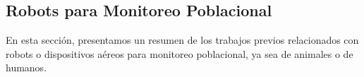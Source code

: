 \subsection{Robots para Monitoreo Poblacional} %
\label{sub:RobotsparaMonitoreoPoblacional}
    En esta secci\'on, presentamos un resumen de los trabajos previos relacionados con robots o dispositivos a\'ereos 
        para monitoreo poblacional, ya sea de animales o de humanos. 
    
    
    
